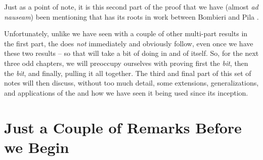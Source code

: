 Just as a point of note, it is this second part of the proof that we have (almost \textit{ad nauseam}) been mentioning that has its roots in work between Bombieri and Pila \cite{bombieri_number_1989}.

Unfortunately, unlike we have seen with a couple of other multi-part results in the first part, the \pwt does \emph{not} immediately and obviously follow, even once we have these two results -- so that will take a bit of doing in and of itself. So, for the next three odd chapters, we will preoccupy ourselves with proving first the \emph{\om bit}, then the \emph{\nt bit}, and finally, pulling it all together. The third and final part of this set of notes will then discuss, without too much detail, some extensions, generalizations, and applications of the \pwt and how we have seen it being used since its inception.

\section{Just a Couple of Remarks Before we Begin}

